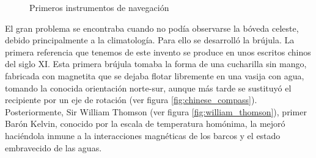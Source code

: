 \begin{figure}[h!btp]
	\begin{adjustbox}{minipage=\linewidth, fbox}
		\centering
		\hspace{10mm}
	\end{adjustbox}
	\caption{Primeros instrumentos de navegación}
	\label{fig:sextante_astrolabio}
\end{figure}

El gran problema se encontraba cuando no podía observarse la bóveda celeste, debido principalmente a la climatología. Para ello se desarrolló la brújula. 
La primera referencia que tenemos de este invento se produce en unos escritos chinos del siglo XI. Esta primera brújula tomaba la forma de una cucharilla sin mango, fabricada con magnetita que se dejaba flotar libremente en una vasija con agua, tomando la conocida orientación norte-sur, aunque más tarde se sustituyó el recipiente por un eje de rotación (ver figura \ref{fig:chinese_compass}).
Posteriormente, Sir William Thomson (ver figura \ref{fig:william_thomson}), primer Barón Kelvin, conocido por la escala de temperatura homónima, la mejoró haciéndola inmune a la interacciones magnéticas de los barcos y el estado embravecido de las aguas. 

